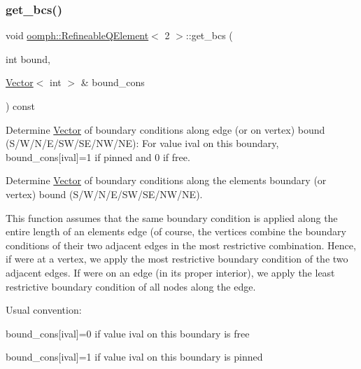 \mbox{\label{classoomph_1_1RefineableQElement_3_012_01_4_a7aaf952d8dfdcf6ed85f42bc0e7bbef2}} 
\subsubsection{\texorpdfstring{get\+\_\+bcs()}{get\_bcs()}}
{\footnotesize\ttfamily void \hyperlink{classoomph_1_1RefineableQElement}{oomph\+::\+Refineable\+Q\+Element}$<$ 2 $>$\+::get\+\_\+bcs (\begin{DoxyParamCaption}\item[{int}]{bound,  }\item[{\hyperlink{classoomph_1_1Vector}{Vector}$<$ int $>$ \&}]{bound\+\_\+cons }\end{DoxyParamCaption}) const}



Determine \hyperlink{classoomph_1_1Vector}{Vector} of boundary conditions along edge (or on vertex) bound (S/\+W/\+N/\+E/\+S\+W/\+S\+E/\+N\+W/\+NE)\+: For value ival on this boundary, bound\+\_\+cons\mbox{[}ival\mbox{]}=1 if pinned and 0 if free. 

Determine \hyperlink{classoomph_1_1Vector}{Vector} of boundary conditions along the element\textquotesingle{}s boundary (or vertex) bound (S/\+W/\+N/\+E/\+S\+W/\+S\+E/\+N\+W/\+NE).

This function assumes that the same boundary condition is applied along the entire length of an element\textquotesingle{}s edge (of course, the vertices combine the boundary conditions of their two adjacent edges in the most restrictive combination. Hence, if we\textquotesingle{}re at a vertex, we apply the most restrictive boundary condition of the two adjacent edges. If we\textquotesingle{}re on an edge (in its proper interior), we apply the least restrictive boundary condition of all nodes along the edge.

Usual convention\+:
\begin{DoxyItemize}
\item bound\+\_\+cons\mbox{[}ival\mbox{]}=0 if value ival on this boundary is free
\item bound\+\_\+cons\mbox{[}ival\mbox{]}=1 if value ival on this boundary is pinned 
\end{DoxyItemize}

